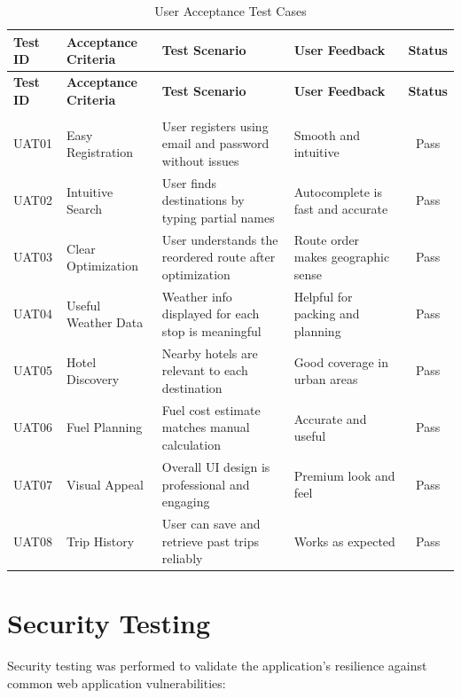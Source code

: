 \begin{longtable}{|p{1.2cm}|p{3cm}|p{5cm}|p{2.5cm}|c|}
    \hline
    \textbf{Test ID} & \textbf{Acceptance Criteria} & \textbf{Test Scenario} & \textbf{User Feedback} & \textbf{Status} \\
    \hline
    \endfirsthead
    \hline
    \textbf{Test ID} & \textbf{Acceptance Criteria} & \textbf{Test Scenario} & \textbf{User Feedback} & \textbf{Status} \\
    \hline
    \endhead
    \hline
    \endfoot
    \hline
    \caption{User Acceptance Test Cases} \label{tab:uat_tests} \\
    \endlastfoot

    UAT01 & Easy Registration & User registers using email and password without issues & Smooth and intuitive & Pass \\
    \hline
    UAT02 & Intuitive Search & User finds destinations by typing partial names & Autocomplete is fast and accurate & Pass \\
    \hline
    UAT03 & Clear Optimization & User understands the reordered route after optimization & Route order makes geographic sense & Pass \\
    \hline
    UAT04 & Useful Weather Data & Weather info displayed for each stop is meaningful & Helpful for packing and planning & Pass \\
    \hline
    UAT05 & Hotel Discovery & Nearby hotels are relevant to each destination & Good coverage in urban areas & Pass \\
    \hline
    UAT06 & Fuel Planning & Fuel cost estimate matches manual calculation & Accurate and useful & Pass \\
    \hline
    UAT07 & Visual Appeal & Overall UI design is professional and engaging & Premium look and feel & Pass \\
    \hline
    UAT08 & Trip History & User can save and retrieve past trips reliably & Works as expected & Pass \\
    \hline
\end{longtable}

\section{Security Testing}
Security testing was performed to validate the application's resilience against common web application vulnerabilities:

